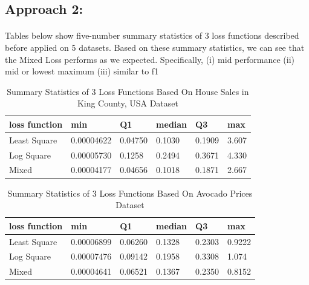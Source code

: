 \documentclass[runningheads]{llncs}
\begin{document}
\subsection{Approach 2:}
\paragraph{}Tables below show five-number summary statistics of 3 loss functions described before applied on 5 datasets. Based on these summary statistics, we can see that the Mixed Loss performs as we expected. Specifically, (i) mid performance (ii) mid or lowest maximum (iii) similar to f1



\begin{table}[h]
\begin{center}
\begin{tabular}{|l|l|l|l|l|l|}
\hline
loss function & min & Q1 & median & Q3 & max \\ \hline
Least Square & 0.00004622 & 0.04750 & 0.1030 & 0.1909 & 3.607 \\ \hline
Log Square & 0.00005730 & 0.1258 & 0.2494 & 0.3671 & 4.330 \\ \hline
Mixed & 0.00004177 & 0.04656 & 0.1018 & 0.1871 & 2.667 \\ \hline
\end{tabular}
\end{center}
\caption{Summary Statistics of 3 Loss Functions Based On House Sales in King County, USA Dataset}\label{summary-statistics-3-functions-k3}
\end{table}


\begin{table}[h]
\begin{center}
\begin{tabular}{|l|l|l|l|l|l|}
\hline
loss function & min & Q1 & median & Q3 & max \\ \hline
Least Square & 0.00006899 & 0.06260 & 0.1328 & 0.2303 & 0.9222 \\ \hline
Log Square & 0.00007476 & 0.09142 & 0.1958 & 0.3308 & 1.074 \\ \hline
Mixed & 0.00004641 & 0.06521 & 0.1367 & 0.2350 & 0.8152 \\ \hline
\end{tabular}
\end{center}
\caption{Summary Statistics of 3 Loss Functions Based On Avocado Prices Dataset}\label{summary-statistics-3-functions-k1}
\end{table}
\end{document}
